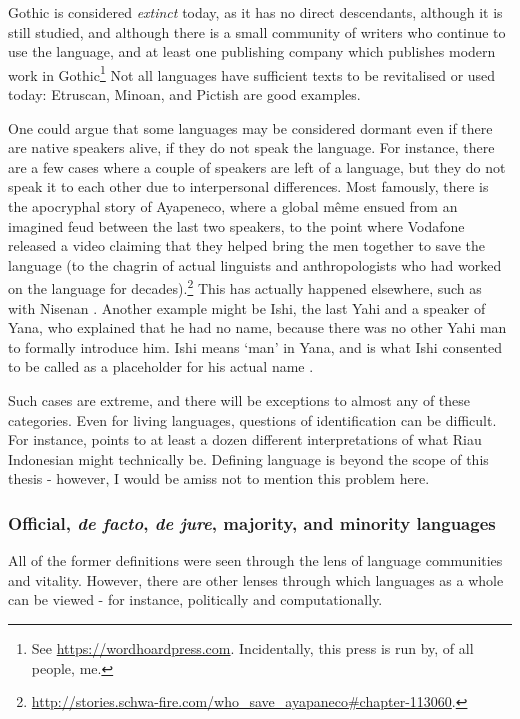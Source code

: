 Gothic is considered \textit{extinct} today, as it has no direct descendants, although it is still studied, and although there is a small community of writers who continue to use the language, and at least one publishing company which publishes modern work in Gothic\footnote{See \href{https://wordhoardpress.com}{https://wordhoardpress.com}.  Incidentally, this press is run by, of all people, me.} Not all languages have sufficient texts to be revitalised or used today: Etruscan, Minoan, and Pictish are good examples.

One could argue that some languages may be considered dormant even if there are native speakers alive, if they do not speak the language. For instance, there are a few cases where a couple of speakers are left of a language, but they do not speak it to each other due to interpersonal differences. Most famously, there is the apocryphal story of Ayapeneco, where a global m\^eme ensued from an imagined feud between the last two speakers, to the point where Vodafone released a video claiming that they helped bring the men together to save the language (to the chagrin of actual linguists and anthropologists who had worked on the language for decades).\footnote{\href{http://stories.schwa-fire.com/who_save_ayapaneco\#chapter-113060}{http://stories.schwa-fire.com/who\_save\_ayapaneco\#chapter-113060}. } This has actually happened elsewhere, such as with Nisenan \citep{snyder2004practice}. Another example might be Ishi, the last Yahi and a speaker of Yana, who explained that he had no name, because there was no other Yahi man to formally introduce him. Ishi means `man' in Yana, and is what Ishi consented to be called as a placeholder for his actual name \citep{kroeber1973ishi}.

Such cases are extreme, and there will be exceptions to almost any of these categories. Even for living languages, questions of identification can be difficult. For instance, \cite{gilRiau} points to at least a dozen different interpretations of what Riau Indonesian might technically be. Defining language is beyond the scope of this thesis - however, I would be amiss not to mention this problem here.

\subsubsection{Official, \textit{de facto}, \textit{de jure}, majority, and minority languages}

All of the former definitions were seen through the lens of language communities and vitality. However, there are other lenses through which languages as a whole can be viewed - for instance, politically and computationally.

